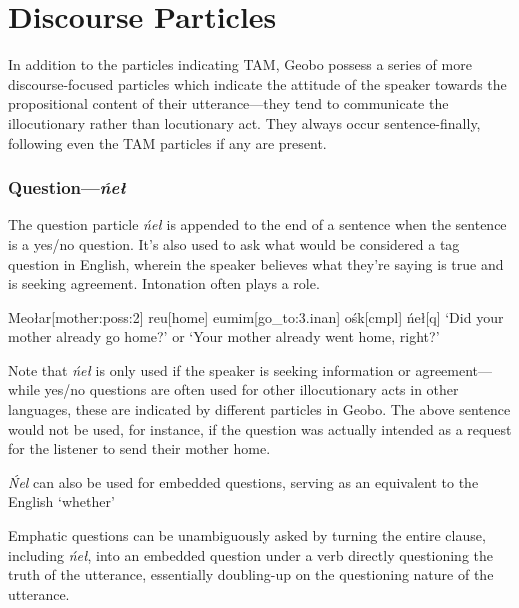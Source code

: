 \documentclass[a4paper,11pt,oneside,openany]{memoir}
\begin{document}
\section{Discourse Particles}

In addition to the particles indicating TAM, Geobo{\engma} possess a series of more discourse-focused particles which indicate the attitude of the speaker towards the propositional content of their utterance---they tend to communicate the illocutionary rather than locutionary act. They always occur sentence-finally, following even the TAM particles if any are present.

\subsubsection{Question---\textit{\'ne\l}}

The question particle \textit{\'ne\l} is appended to the end of a sentence when the sentence is a yes/no question. It's also used to ask what would be considered a tag question in English, wherein the speaker believes what they're saying is true and is seeking agreement. Intonation often plays a role.

\ex
\begingl
Meo\l ar[mother:{\sc poss:2}]
reu[home]
eumim[go\_to:{\sc 3.inan}]
o\'sk[\sc cmpl]
\'ne\l[\sc q]
\glft `Did your mother already go home?' or `Your mother already went home, right?'
\endgl 
\xe

Note that \textit{\'ne\l} is only used if the speaker is seeking information or agreement---while yes/no questions are often used for other illocutionary acts in other languages, these are indicated by different particles in Geobo{\engma}. The above sentence would not be used, for instance, if the question was actually intended as a request for the listener to send their mother home.

\textit{\'Nel} can also be used for embedded questions, serving as an equivalent to the English `whether'


Emphatic questions can be unambiguously asked by turning the entire clause, including \textit{\'ne\l}, into an embedded question under a verb directly questioning the truth of the utterance, essentially doubling-up on the questioning nature of the utterance.
\end{document}
